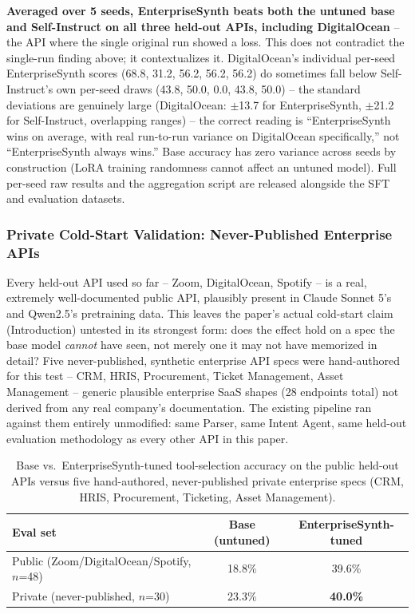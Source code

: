 \documentclass[11pt]{article}
\begin{document}
\textbf{Averaged over 5 seeds, EnterpriseSynth beats both the untuned base and Self-Instruct on
all three held-out APIs, including DigitalOcean} -- the API where the single original run showed a
loss. This does not contradict the single-run finding above; it contextualizes it. DigitalOcean's
individual per-seed EnterpriseSynth scores (68.8, 31.2, 56.2, 56.2, 56.2) do sometimes fall below
Self-Instruct's own per-seed draws (43.8, 50.0, 0.0, 43.8, 50.0) -- the standard deviations are
genuinely large (DigitalOcean: $\pm$13.7 for EnterpriseSynth, $\pm$21.2 for Self-Instruct,
overlapping ranges) -- the correct reading is ``EnterpriseSynth wins on average, with real
run-to-run variance on DigitalOcean specifically,'' not ``EnterpriseSynth always wins.'' Base
accuracy has zero variance across seeds by construction (LoRA training randomness cannot affect an
untuned model). Full per-seed raw results and the aggregation script are released alongside the
SFT and evaluation datasets.

\subsubsection{Private Cold-Start Validation: Never-Published Enterprise APIs}
Every held-out API used so far -- Zoom, DigitalOcean, Spotify -- is a real, extremely
well-documented public API, plausibly present in Claude Sonnet 5's and Qwen2.5's pretraining
data. This leaves the paper's actual cold-start claim (Introduction) untested in its strongest form:
does the effect hold on a spec the base model \textit{cannot} have seen, not merely one it may not
have memorized in detail? Five never-published, synthetic enterprise API specs were hand-authored
for this test -- CRM, HRIS, Procurement, Ticket Management, Asset Management -- generic plausible
enterprise SaaS shapes (28 endpoints total) not derived from any real company's documentation. The
existing pipeline ran against them entirely unmodified: same Parser, same Intent Agent, same
held-out evaluation methodology as every other API in this paper.

\begin{table}[htbp]
\centering
\footnotesize
\setlength{\tabcolsep}{2pt}
\caption{Base vs.\ EnterpriseSynth-tuned tool-selection accuracy on the public held-out APIs
versus five hand-authored, never-published private enterprise specs (CRM, HRIS, Procurement,
Ticketing, Asset Management).}
\label{tab:coldstart-private}
\begin{tabular}{lcc}
\toprule
\textbf{Eval set} & \textbf{Base (untuned)} & \textbf{EnterpriseSynth-tuned} \\
\midrule
Public (Zoom/DigitalOcean/Spotify, $n$=48) & 18.8\% & 39.6\% \\
Private (never-published, $n$=30) & 23.3\% & \textbf{40.0\%} \\
\bottomrule
\end{tabular}
\end{table}
\end{document}
